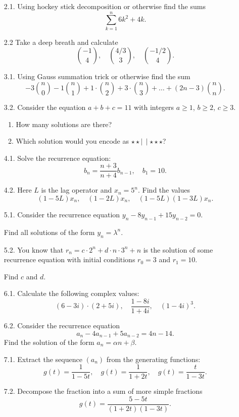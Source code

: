 \documentclass[12pt]{article}
\begin{document}




\begin{enumerate} 
    \item[2.1.] Using hockey stick decomposition or otherwise find the sums
    \[
    \sum_{k=1}^{n} {6k^2 + 4k}.
    \]

    \item[2.2] Take a deep breath and calculate 
\[
{-1 \choose 4},\quad  {4/3 \choose 3}, \quad  {-1/2 \choose 4}. 
\]


    \item[3.1.] Using Gauss summation trick or otherwise find the sum 
    \[
    -3{n\choose 0} -1 {n \choose 1} +1 \cdot {n \choose 2} + 3 \cdot {n \choose 3} + \dots + (2n - 3) {n \choose n}.
    \]
    \item[3.2.] Consider the equation $a + b + c = 11$ with integers $a \geq 1$, $b \geq 2$, $c\geq 3$.

    \begin{enumerate}
        \item How many solutions are there?
        \item Which solution would you encode as $\star \star \mid \, \mid \star\star\star$?
    \end{enumerate}

    \item[4.1.] Solve the recurrence equation:
    \[
    b_n = \frac{n + 3}{n + 4} b_{n-1}, \quad b_1 = 10.
    \]
    \item[4.2.] Here $L$ is the lag operator and $x_n = 5^n$. 
    Find the values
    \[
    (1 - 5L) x_n, \quad (1 - 2L)x_n, \quad (1-5L)(1 - 3L)x_n.
    \]


    \item[5.1.] Consider the recurrence equation $y_n - 8 y_{n-1} + 15 y_{n-2} = 0$.
    
    Find all solutions of the form $y_n = \lambda^n$.
    \item[5.2.] You know that $r_n = c \cdot 2^n + d \cdot n \cdot 3^n + n$ is the solution of some recurrence equation with initial conditions  $r_0 = 3$ and $r_1 = 10$.
    
    Find $c$ and $d$. 

    \item[6.1.] Calculate the following complex values: 
    \[
    (6 - 3i) \cdot (2 + 5i), \quad \frac{1 - 8i}{1 + 4i}, \quad (1 - 4i)^3.
    \]
    \item[6.2.] Consider the recurrence equation
    \[
    a_n - 4 a_{n-1} + 5 a_{n-2} = 4 n -14.
    \] 
    Find the solution of the form $a_n = \alpha n + \beta$.


    \item[7.1.] Extract the sequence $(a_n)$ from the generating functions:
    \[
    g(t) = \frac{1}{1 - 5t}, \quad g(t) = \frac{1}{1 + 2t}, \quad g(t) = \frac{t}{1 - 3t}.
    \]
    \item[7.2.] Decompose the fraction into a sum of more simple fractions
    \[
    g(t) = \frac{5 - 5t}{(1 + 2t)(1-3t)}.
    \]
\end{enumerate}
\end{document}
